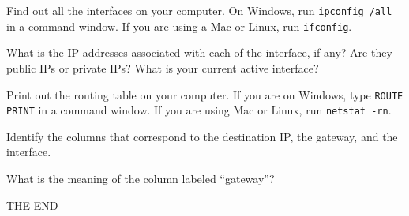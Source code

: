 \documentclass[a4paper,11pt]{exam}
\begin{document}
\begin{questions}
\question
Find out all the interfaces on your computer.  On Windows, run \texttt{ipconfig /all} in a command window.  If you are using a Mac or Linux, run \texttt{ifconfig}.

What is the IP addresses associated with each of the interface, if any?  Are they public IPs or private IPs?  What is your current active interface?

\question

Print out the routing table on your computer.  If you are on Windows, type \texttt{ROUTE PRINT} in a command window.  If you are using Mac or Linux, run \texttt{netstat -rn}.

Identify the columns that correspond to the destination IP, the gateway, and the interface.  

What is the meaning of the column labeled ``gateway''?

\end{questions}

\vfill
\begin{center}
    \textsf{\Huge THE END}
\end{center}
\end{document}

